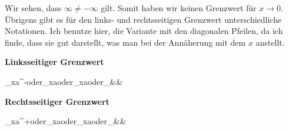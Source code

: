 \documentclass[12pt]{article}
\begin{document}
	Wir sehen, dass $\infty \neq -\infty$ gilt. Somit haben wir keinen Grenzwert für $x\to 0$. Übrigens gibt es für den links- und rechtsseitigen Grenzwert unterschiedliche Notationen. Ich benutze hier, die Variante mit den diagonalen Pfeilen, da ich finde, dass sie gut darstellt, was man bei der Annäherung mit dem $x$ anstellt.
	\begin{tcolorbox}[boxsep=0pt,top=.75cm,left=1cm,right=1cm, bottom=.65cm,arc=0pt,auto outer arc,colback=white,colframe=black, enlarge top by=.45cm, enlarge bottom by=.25cm]
		\begin{multicols}{2}
			\begin{flushleft}
				\textbf{Linksseitiger Grenzwert}
				\begin{flalign*}
				\lim_{x\to a^-}\;oder\;\lim_{x\uparrow a}\;oder\;\lim_{x\nearrow a}\;oder\;\lim_{}&&
				\end{flalign*}
			\end{flushleft}
			\begin{flushleft}
				\textbf{Rechtsseitiger Grenzwert}
				\begin{flalign*}
				\lim_{x\to a^+}\;oder\;\lim_{x\downarrow a}\;oder\;\lim_{x\searrow a}\;oder\;\lim_{\substack{x\to a\\ x>a}}&&
				\end{flalign*}
			\end{flushleft}
		\end{multicols}
	\end{tcolorbox}
\end{document}
